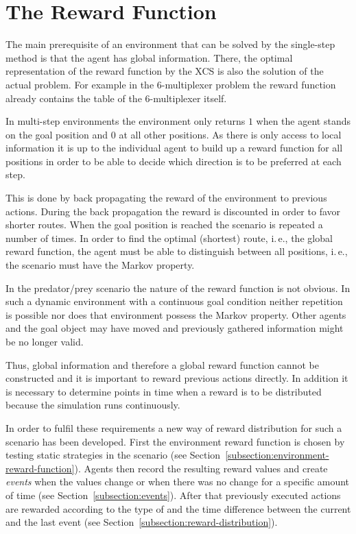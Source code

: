 \section{The Reward Function}
\label{section:the-reward-function}

The main prerequisite of an environment that can be solved by the single-step method is that the agent has global information. There, the optimal representation of the reward function by the XCS is also the solution of the actual problem. For example in the 6-multiplexer problem the reward function already contains the table of the 6-multiplexer itself. 

In multi-step environments the environment only returns $1$ when the agent stands on the goal position and $0$ at all other positions. As there is only access to local information it is up to the individual agent to build up a reward function for all positions in order to be able to decide which direction is to be preferred at each step.

This is done by back propagating the reward of the environment to previous actions. During the back propagation the reward is discounted in order to favor shorter routes. When the goal position is reached the scenario is repeated a number of times. In order to find the optimal (shortest) route, i.\,e., the global reward function, the agent must be able to distinguish between all positions, i.\,e., the scenario must have the Markov property.

In the predator/prey scenario the nature of the reward function is not obvious. 
In such a dynamic environment with a continuous goal condition neither repetition is possible nor does that environment possess the Markov property. Other agents and the goal object may have moved and previously gathered information might be no longer valid.

Thus, global information and therefore a global reward function cannot be constructed and it is important to reward previous actions directly. In addition it is necessary to determine points in time when a reward is to be distributed because the simulation runs continuously.

In order to fulfil these requirements a new way of reward distribution for such a scenario has been developed. First the environment reward function is chosen by testing static strategies in the scenario (see Section~\ref{subsection:environment-reward-function}). Agents then record the resulting reward values and create \emph{events} when the values change or when there was no change for a specific amount of time (see Section~\ref{subsection:events}). After that previously executed actions are rewarded according to the type of and the time difference between the current and the last event (see Section~\ref{subsection:reward-distribution}).

